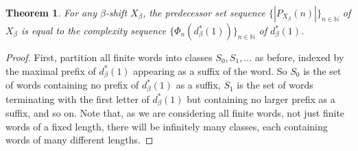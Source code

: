 \documentclass{amsart}
\newtheorem{theorem}{Theorem}[section]
\theoremstyle{definition}
\numberwithin{equation}{section}
\begin{document}
\begin{theorem}\label{PSSBeta}
For any $\beta$-shift $X_\beta$, the predecessor set sequence $\{|P_{X_\beta}(n)|\}_{n \in \mathbb{N}}$ of $X_\beta$ is equal to the complexity sequence $\{\Phi_n(d_\beta^*(1))\}_{n \in \mathbb{N}}$ of $d_\beta^*(1)$.
\end{theorem}
\begin{proof}
First, partition all finite words into classes $S_0, S_1, ...$ as before, indexed by the maximal prefix of $d_\beta^* (1)$ appearing as a suffix of the word. So $S_0$ is the set of words containing no prefix of $d_\beta^* (1)$ as a suffix, $S_1$ is the set of words terminating with the first letter of $d_\beta^* (1)$ but containing no larger prefix as a suffix, and so on. Note that, as we are considering all finite words, not just finite words of a fixed length, there will be infinitely many classes, each containing words of many different lengths.


\end{proof}
\end{document}

